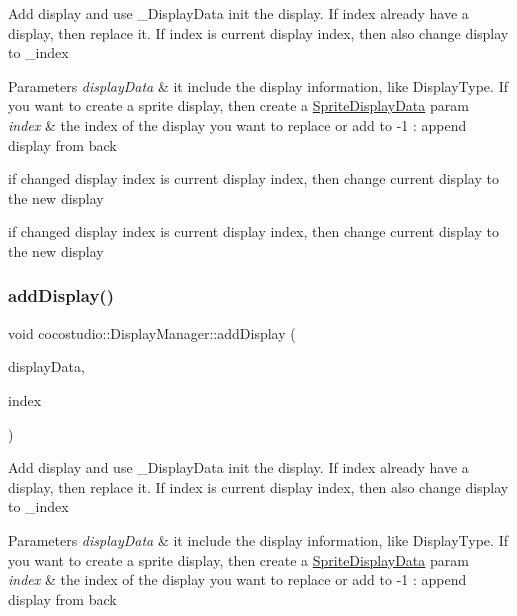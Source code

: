 Add display and use \+\_\+\+Display\+Data init the display. If index already have a display, then replace it. If index is current display index, then also change display to \+\_\+index


\begin{DoxyParams}{Parameters}
{\em display\+Data} & it include the display information, like Display\+Type. If you want to create a sprite display, then create a \hyperlink{classcocostudio_1_1SpriteDisplayData}{Sprite\+Display\+Data} param\\
\hline
{\em index} & the index of the display you want to replace or add to -\/1 \+: append display from back \\
\hline
\end{DoxyParams}
if changed display index is current display index, then change current display to the new display

if changed display index is current display index, then change current display to the new display \mbox{\label{classcocostudio_1_1DisplayManager_a8e9ebcae212efcdebc814dc4010b4fc8}} 
\subsubsection{\texorpdfstring{add\+Display()}{addDisplay()}\hspace{0.1cm}{\footnotesize\ttfamily [2/3]}}
{\footnotesize\ttfamily void cocostudio\+::\+Display\+Manager\+::add\+Display (\begin{DoxyParamCaption}\item[{\hyperlink{classcocostudio_1_1DisplayData}{Display\+Data} $\ast$}]{display\+Data,  }\item[{int}]{index }\end{DoxyParamCaption})}

Add display and use \+\_\+\+Display\+Data init the display. If index already have a display, then replace it. If index is current display index, then also change display to \+\_\+index


\begin{DoxyParams}{Parameters}
{\em display\+Data} & it include the display information, like Display\+Type. If you want to create a sprite display, then create a \hyperlink{classcocostudio_1_1SpriteDisplayData}{Sprite\+Display\+Data} param\\
\hline
{\em index} & the index of the display you want to replace or add to -\/1 \+: append display from back \\
\hline
\end{DoxyParams}
\mbox{\label{classcocostudio_1_1DisplayManager_a2af09bbaa5e3257f00454a024192539c}} 
